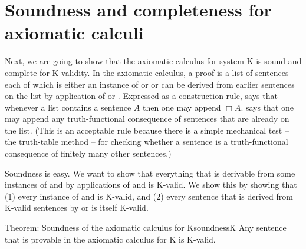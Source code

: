 \fi 

\section{Soundness and completeness for axiomatic calculi}
\label{sec:scaxiomatic}

Next, we are going to show that the axiomatic calculus for system K is sound and
complete for K-validity. In the axiomatic calculus, a proof is a list of
sentences each of which is either an instance of  or  or can be
derived from earlier sentences on the list by application of  or
. Expressed as a construction rule,  says that whenever a list
contains a sentence $A$ then one may append $\Box A$.  says that one may
append any truth-functional consequence of sentences that are already on the
list. (This is an acceptable rule because there is a simple mechanical test --
the truth-table method -- for checking whether a sentence is a truth-functional
consequence of finitely many other sentences.)

Soundness is easy. We want to show that everything that is derivable from some
instances of  and  by applications of  and  is
K-valid. We show this by showing that (1) every instance of  and 
is K-valid, and (2) every sentence that is derived from K-valid sentences by
 or  is itself K-valid.

\begin{theorem}{Theorem: Soundness of the axiomatic calculus for K}{soundnessK}
  Any sentence that is provable in the axiomatic calculus for K is K-valid.
\end{theorem}

